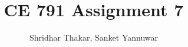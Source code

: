 \documentclass[11pt]{article}
\begin{document}
\title{CE 791 Assignment 7}
\author{Shridhar Thakar, Sanket Yannuwar}


\maketitle


\end{document}
